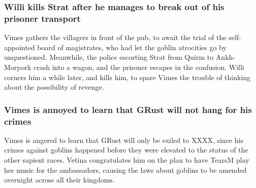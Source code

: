 \subsubsection{\Gls{Willi} kills \Gls{Strat} after he manages to break out of his prisoner
    transport}
\Gls{Vimes} gathers the villagers in front of the pub, to await the trial of the self-appointed
board of magistrates, who had let the goblin atrocities go by unquestioned. Meanwhile, the police
escorting \Gls{Strat} from Quirm to Ankh-Morpork crash into a wagon, and the prisoner escapes in
the confusion. \Gls{Willi} corners him a while later, and kills him, to spare \Gls{Vimes} the
trouble of thinking about the possibility of revenge.

\subsubsection{\Gls{Vimes} is annoyed to learn that \Gls{GRust} will not hang for his crimes}
\Gls{Vimes} is angered to learn that \Gls{GRust} will only be exiled to XXXX, since his crimes
against goblins happened before they were elevated to the status of the other sapient races.
\Gls{Vetina} congratulates him on the plan to have \Gls{TearsM} play her music for the ambassadors,
causing the laws about goblins to be amended overnight across all their kingdoms.
